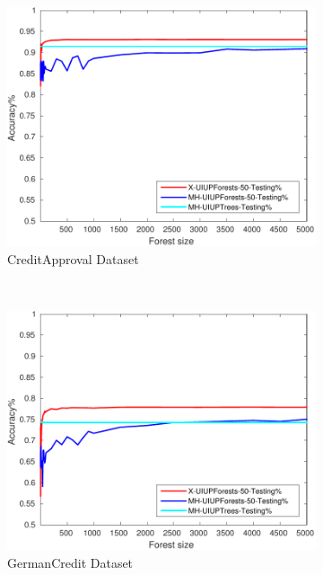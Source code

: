 \begin{figure}[ht]
  \begin{subfigure}[b]{0.3\textwidth}
		\centering
  	\includegraphics[width=\textwidth]{figs/PLPTF/Forests/CreditApprovalDownsampledFurther_Forests_X_MH.pdf}
  	\caption{CreditApproval Dataset}
		\label{fig:Crd3}
	\end{subfigure}
  \\
  \begin{subfigure}[b]{0.3\textwidth}
		\centering
  	\includegraphics[width=\textwidth]{figs/PLPTF/Forests/GermanCreditDownsampledFurther_Forests_X_MH.pdf}
  	\caption{GermanCredit Dataset}
		\label{fig:G3}
	\end{subfigure}
  \begin{subfigure}[b]{0.3\textwidth}

\end{subfigure}
\end{figure}
